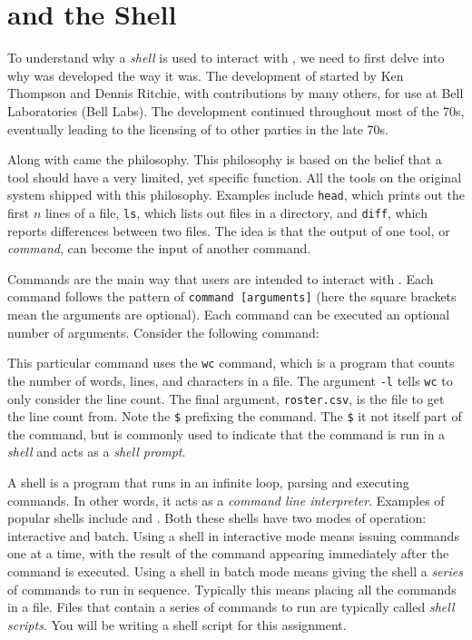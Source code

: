 \section{\Unix{} and the Shell}\label{section:unix}

\noindent To understand why a \emph{shell} is used to interact with
\Unix{}, we need to first delve into why \Unix{} was developed the
way it was. The development of \Unix{} started by
Ken Thompson and Dennis Ritchie, with contributions by many others, for use at Bell
Laboratories (Bell Labs). The development continued throughout most of the 70s, eventually leading
to the licensing of \Unix{} to other parties in the late 70s.

Along with \Unix{} came the \Unix{} philosophy. This philosophy is
based on the belief that a tool should have a very limited, yet specific
function. All the tools on the original \Unix{} system shipped with this
philosophy. Examples include \texttt{head}, which prints out the first $n$ lines
of a file, \texttt{ls}, which lists out files in a directory, and \texttt{diff},
which reports differences between two files. The idea is that the output of one
tool, or \emph{command}, can become the input of another command.

Commands are the main way that users are intended to interact with
\Unix{}. Each command follows the pattern of \texttt{command
[arguments]} (here the square brackets mean the arguments are
optional). Each command can be executed an optional number of
arguments. Consider the following command:


This particular command uses the \texttt{wc} command, which is a program that
counts the number of words, lines, and characters in a file. The argument
\texttt{-l} tells \texttt{wc} to only consider the line count. The final
argument, \texttt{roster.csv}, is the file to get the line count from. Note the
\texttt{\$} prefixing the command. The \texttt{\$} it not itself part of the
command, but is commonly used to indicate that the command is run in a
\emph{shell} and acts as a \emph{shell prompt}.

A shell is a program that runs in an infinite loop, parsing and executing
commands. In other words, it acts as a \emph{command line interpreter}. Examples
of popular shells include \Bash{} and \Zsh{}. Both these shells have two modes of
operation: interactive and batch. Using a shell in interactive mode means
issuing commands one at a time, with the result of the command appearing
immediately after the command is executed. Using a shell in batch mode means
giving the shell a \emph{series} of commands to run in sequence. Typically this
means placing all the commands in a file. Files that contain a series of
commands to run are typically called \emph{shell scripts}. You will be writing a
shell script for this assignment.
